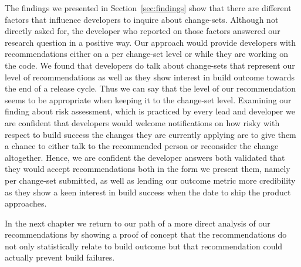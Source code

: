 The findings we presented in Section~\ref{sec:findings} show that there are different factors that influence developers to inquire about change-sets.
Although not directly asked for, the developer who reported on those factors answered our research question in a positive way.
Our approach would provide developers with recommendations either on a per change-set level or while they are working on the code.
We found that developers do talk about change-sets that represent our level of recommendations as well as they show interest in build outcome towards the end of a release cycle.
Thus we can say that the level of our recommendation seems to be appropriate when keeping it to the change-set level.
Examining our finding about risk assessment, which is practiced by every lead and developer we are confident that developers would welcome notifications on how risky with respect to build success the changes they are currently applying are to give them a chance to either talk to the recommended person or reconsider the change altogether.
Hence, we are confident the developer answers both validated that they would accept recommendations both in the form we present them, namely per change-set submitted, as well as lending our outcome metric more credibility as they show a keen interest in build success when the date to ship the product approaches.

In the next chapter we return to our path of a more direct analysis of our recommendations by showing a proof of concept that the recommendations do not only statistically relate to build outcome but that recommendation could actually prevent build failures.